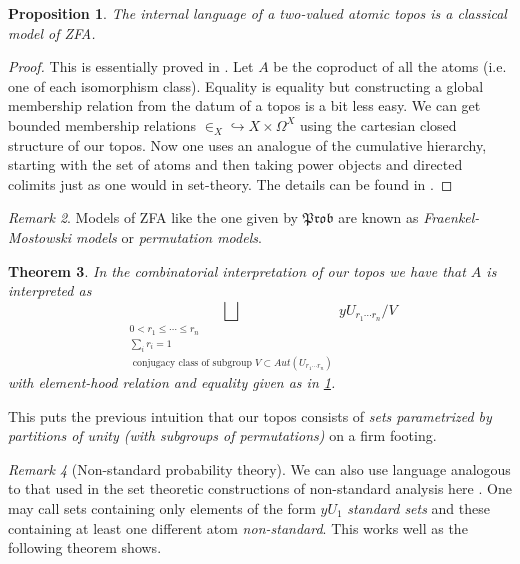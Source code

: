 \documentclass[a4paper]{amsproc}
\theoremstyle{plain}
\newtheorem{theorem}{Theorem}[section]
\newtheorem{proposition}[theorem]{Proposition}
\theoremstyle{definition}
\theoremstyle{remark}
\newtheorem{remark}[theorem]{Remark}
\numberwithin{equation}{section}
\newcommand{\Prob}{\mathfrak{Prob}}
\begin{document}
\begin{proposition}\label{ZFA} The internal language of a two-valued atomic topos is a classical model of ZFA.
\end{proposition}
\begin{proof}
This is essentially proved in \cite{set_theory}.
Let $A$ be the coproduct of all the atoms (i.e. one of each isomorphism class).
 Equality is equality but constructing a global membership relation from the datum of a topos is a bit less easy.\newline
\indent We can get bounded membership relations $\in_X\hookrightarrow X\times \Omega^X$ using the cartesian closed structure of our topos.\newline
\indent Now one uses an analogue of the cumulative hierarchy, starting with the set of atoms and then taking power objects and directed colimits just as one would in set-theory. The details can be found in \cite{set_theory}.
\end{proof}
\begin{remark} Models of ZFA like the one given by $\Prob$ are known as \emph{Fraenkel-Mostowski models} or \emph{permutation models}.
\end{remark}
\begin{theorem}
In the combinatorial interpretation of our topos we have that $A$ is interpreted as \\\[\bigsqcup_{\substack{0<r_1\leq  \cdots\leq r_n \\ \sum_i r_i=1 \\ [V]\text{ conjugacy class of subgroup }V\subset Aut(U_{r_1\cdots r_n})}} yU_{r_1\cdots r_n}/V\]%
 with element-hood relation and equality given as in \ref{ZFA}.
 \end{theorem}
 This puts the previous intuition that our topos consists of \emph{sets parametrized by partitions of unity (with subgroups of permutations)} on a firm footing.
\begin{remark}[Non-standard probability theory] We can also use language analogous to that used in the set theoretic constructions of non-standard analysis here \cite{XYZ} . One may call sets containing only elements of the form $yU_1$ \emph{standard sets} and these containing at least one different atom \emph{non-standard}. This works well as the following theorem shows. %
\end{remark}
\end{document}

